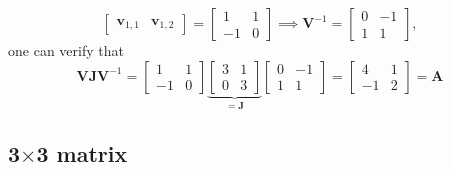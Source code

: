 \documentclass[12pt,a4paper]{article}
\begin{document}
\begin{itemize}
\begin{itemize}
\begin{equation}
      \begin{bmatrix}
        \bm{v}_{1,1} & \bm{v}_{1,2}
      \end{bmatrix}
      =
      \begin{bmatrix}
        1 & 1 \\
        -1 & 0
      \end{bmatrix}
      \implies
      \bm{V}^{-1}
      = 
      \begin{bmatrix}
        0 & -1 \\
        1 & 1
      \end{bmatrix},
    \end{equation}
    one can verify that
    \begin{equation}\nonumber%
      \bm{V}\bm{J}\bm{V}^{-1}
      =
      \begin{bmatrix}
        1 & 1 \\
        -1 & 0
      \end{bmatrix}
      \underbrace{
      \begin{bmatrix}
        3 & 1 \\
        0 & 3
      \end{bmatrix}}_{=\bm{J}}
      \begin{bmatrix}
        0 & -1 \\
        1 & 1
      \end{bmatrix}
      =
      \begin{bmatrix}
        4 & 1 \\
        -1 & 2
      \end{bmatrix}
      = \bm{A}
    \end{equation}
    
  \end{itemize}

\end{itemize}

\subsection{3$\times$3 matrix}
\end{document}
